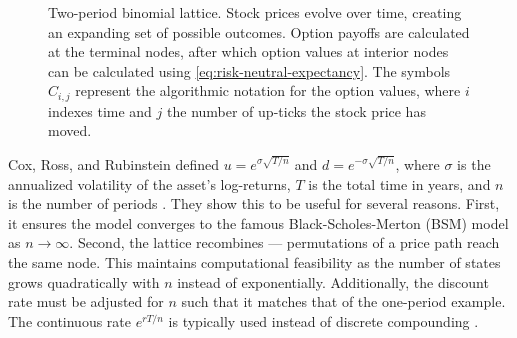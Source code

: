 \documentclass[english,12pt,a4paper,pdftex,sci,utf8]{aaltothesis}
\begin{document}
\begin{figure}[bp]
    \centering
        \caption{Two-period binomial lattice. Stock prices evolve over time, creating an expanding set of possible outcomes. Option payoffs are calculated at the terminal nodes, after which option values at interior nodes can be calculated using \cref{eq:risk-neutral-expectancy}. The symbols $C_{i,j}$ represent the algorithmic notation for the option values, where $i$ indexes time and $j$ the number of up-ticks the stock price has moved.}
    \label{fig:crr-twoperiod}
\end{figure}
Cox, Ross, and Rubinstein defined $u = e^{\sigma\sqrt{T/n}}$ and $d = e^{-\sigma\sqrt{T/n}}$, where $\sigma$ is the annualized volatility of the asset's log-returns, $T$ is the total time in years, and $n$ is the number of periods \cite{cox1979option}. They show this to be useful for several reasons. First, it ensures the model converges to the famous Black-Scholes-Merton (BSM) model as $n \rightarrow \infty$. Second, the lattice recombines --- permutations of a price path reach the same node. This maintains computational feasibility as the number of states grows quadratically with $n$ instead of exponentially. Additionally, the discount rate must be adjusted for $n$ such that it matches that of the one-period example. The continuous rate $e^{rT/n}$ is typically used instead of discrete compounding \cite{hull2018}.
\end{document}
